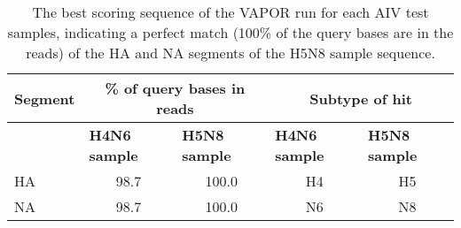 \setlength{\tabcolsep}{8pt}
\renewcommand{\arraystretch}{1.3}
\begin{table}[ht!]
    \centering
    \begin{tabular}{@{}lcccc@{}}
    \toprule
    \multicolumn{1}{c}{\textbf{Segment}} & \multicolumn{2}{c}{\textbf{\% of query bases in reads}}                             & \multicolumn{2}{c}{\textbf{Subtype of hit}}                                         \\ \midrule
                                         & \multicolumn{1}{l}{\textbf{H4N6 sample}} & \multicolumn{1}{l}{\textbf{H5N8 sample}} & \multicolumn{1}{l}{\textbf{H4N6 sample}} & \multicolumn{1}{l}{\textbf{H5N8 sample}} \\ \cmidrule(l){2-5} 
    HA                                   & 98.7                                    & 100.0                                      & H4                                       & H5                                       \\
    NA                                   & 98.7                                    & 100.0                                      & N6                                       & N8                                       \\ \bottomrule
    \end{tabular}
    \caption[Results of the VAPOR run with AIV test samples.]{The best scoring sequence of the VAPOR run for each AIV test samples, indicating a perfect match (100\% of the query bases are in the reads) of the HA and NA segments of the H5N8 sample sequence.}    
\label{tab:4-aiv-vapor}
\end{table}

